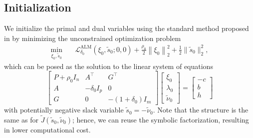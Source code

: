 \documentclass[letterpaper, 10 pt, conference]{ieeeconf}  \IEEEoverridecommandlockouts
\begin{document}
\subsection{Initialization}
We initialize the primal and dual variables using the standard method proposed in \cite{andersen2011} by minimizing the unconstrained optimization problem
\begin{equation*}
\begin{aligned}
\min_{\xi_0,\tilde{s}_0} \quad & \mathcal{L}^\text{ALM}_{\delta_0}(\xi_0,\tilde{s}_0;0,0)+ \frac{\rho_0}{2}\left\|\xi_0\right\|_2^2 + \frac{1}{2} \|\tilde{s}_0\|_2^2,
\end{aligned}
\end{equation*}
which can be posed as the solution to the linear system of equations
\begin{equation}
\begin{bmatrix}
P + \rho_0 I_n & A^\top & G^\top \\[0.12cm]
A & -\delta_0 I_p & 0 \\[0.12cm]
G & 0 & -(1 + \delta_0) I_m
\end{bmatrix}
\begin{bmatrix}
\xi_0 \\[0.12cm]
\lambda_0 \\[0.12cm]
\tilde{\nu}_0
\end{bmatrix}
=
\begin{bmatrix}
-c \\[0.12cm]
b \\[0.12cm]
h
\end{bmatrix}
\end{equation}
with potentially negative slack variable $\tilde{s}_0 = -\tilde{\nu}_0$. Note that the structure is the same as for $\tilde J(\tilde{s}_0,\tilde{\nu}_0)$; hence, we can reuse the symbolic factorization, resulting in lower computational cost.
\end{document}
